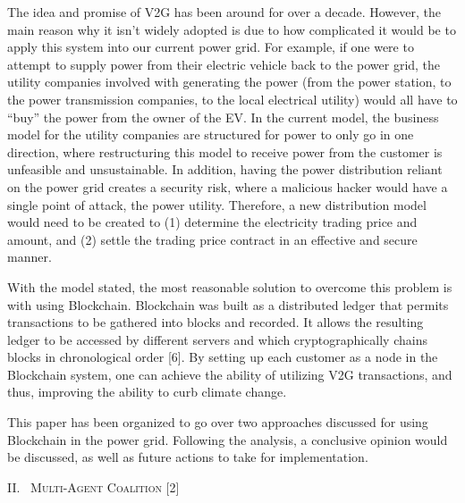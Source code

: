 \documentclass[
]{article}
\begin{document}
The idea and promise of V2G has been around for over a decade. However,
the main reason why it isn't widely adopted is due to how complicated it
would be to apply this system into our current power grid. For example,
if one were to attempt to supply power from their electric vehicle back
to the power grid, the utility companies involved with generating the
power (from the power station, to the power transmission companies, to
the local electrical utility) would all have to ``buy'' the power from
the owner of the EV. In the current model, the business model for the
utility companies are structured for power to only go in one direction,
where restructuring this model to receive power from the customer is
unfeasible and unsustainable. In addition, having the power distribution
reliant on the power grid creates a security risk, where a malicious
hacker would have a single point of attack, the power utility.
Therefore, a new distribution model would need to be created to (1)
determine the electricity trading price and amount, and (2) settle the
trading price contract in an effective and secure manner.

With the model stated, the most reasonable solution to overcome this
problem is with using Blockchain. Blockchain was built as a distributed
ledger that permits transactions to be gathered into blocks and
recorded. It allows the resulting ledger to be accessed by different
servers and which cryptographically chains blocks in chronological order
{[}6{]}. By setting up each customer as a node in the Blockchain system,
one can achieve the ability of utilizing V2G transactions, and thus,
improving the ability to curb climate change.

This paper has been organized to go over two approaches discussed for
using Blockchain in the power grid. Following the analysis, a conclusive
opinion would be discussed, as well as future actions to take for
implementation.

II.~ \textsc{Multi-Agent Coalition {[}2{]}}
\end{document}
